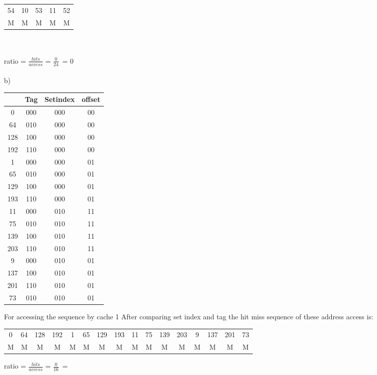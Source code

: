\documentclass[12pt]{article}
\begin{document}
\begin{tabular}{ |c|c|c| c|c|} 
	\hline
	54 & 10 & 53 & 11 & 52 \\ 
	
	M&M&M&M&M \\ 
	
	\hline
\end{tabular}\\
\\
ratio  =
\(\frac{hits}{access}\) =
\(\frac{0}{24}\)\      =
0     \\
\\
b)

\begin{center}
	\begin{tabular}{ |c|c|c|c| } 
		\hline
		& Tag & Setindex & offset \\ 
		\hline
		0&000 & 000 & 00 \\ 
		64&010&000&00\\ 
		128&100&000&00\\
		192&110&000&00\\
		1&000&000&01\\
		65&010&000&01\\
		129&100&000&01\\
		193&110&000&01\\
		11&000&010&11\\
		75&010&010&11\\
		139&100&010&11\\
		203&110&010&11\\
		9&000&010&01\\
		137&100&010&01\\
		201&110&010&01\\
		73&010&010&01\\
		\hline
	\end{tabular}
\end{center}
For accessing the sequence by cache 1
After comparing set index and tag the hit miss sequence of these address access is:\\
\begin{center}
	\begin{tabular}{ |c|c|c|c|c|c|c|c|c|c|c|c|c|c|c|c| } 
		\hline
		0&64&128&192&1&65&129&193&11&75&139&203&9&137&201&73 \\ 
		
		M&M&M&M&M&M&M&M&M&M&M&M&M&M&M&M \\  
		\hline
	\end{tabular}
\end{center}
ratio  =
\(\frac{hits}{access}\) =
\(\frac{0}{16}\)\      =
\end{document}
